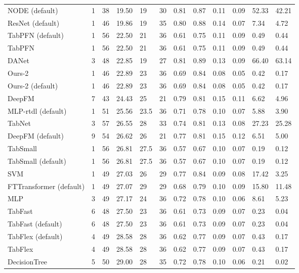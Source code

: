 \begin{tabular}{lllllrllllll}
NODE (default) & 1 & 38 & 19.50 & 19 & 30 & 0.81 & 0.87 & 0.11 & 0.09 & 52.33 & 42.21 \\
ResNet (default) & 1 & 46 & 19.86 & 19 & 35 & 0.80 & 0.88 & 0.14 & 0.07 & 7.34 & 4.72 \\
TabPFN (default) & 1 & 56 & 22.50 & 21 & 36 & 0.61 & 0.75 & 0.11 & 0.09 & 0.49 & 0.44 \\
TabPFN & 1 & 56 & 22.50 & 21 & 36 & 0.61 & 0.75 & 0.11 & 0.09 & 0.49 & 0.44 \\
DANet & 3 & 48 & 22.85 & 19 & 27 & 0.81 & 0.89 & 0.13 & 0.09 & 66.40 & 63.14 \\
Ours-2 & 1 & 46 & 22.89 & 23 & 36 & 0.69 & 0.84 & 0.08 & 0.05 & 0.42 & 0.17 \\
Ours-2 (default) & 1 & 46 & 22.89 & 23 & 36 & 0.69 & 0.84 & 0.08 & 0.05 & 0.42 & 0.17 \\
DeepFM & 7 & 43 & 24.43 & 25 & 21 & 0.79 & 0.81 & 0.15 & 0.11 & 6.62 & 4.96 \\
MLP-rtdl (default) & 1 & 51 & 25.56 & 23.5 & 36 & 0.71 & 0.78 & 0.10 & 0.07 & 5.88 & 3.90 \\
TabNet & 3 & 57 & 26.55 & 28 & 33 & 0.74 & 0.81 & 0.13 & 0.08 & 27.23 & 25.28 \\
DeepFM (default) & 9 & 54 & 26.62 & 26 & 21 & 0.77 & 0.81 & 0.15 & 0.12 & 6.51 & 5.00 \\
TabSmall & 1 & 56 & 26.81 & 27.5 & 36 & 0.57 & 0.67 & 0.10 & 0.07 & 0.19 & 0.12 \\
TabSmall (default) & 1 & 56 & 26.81 & 27.5 & 36 & 0.57 & 0.67 & 0.10 & 0.07 & 0.19 & 0.12 \\
SVM & 1 & 49 & 27.03 & 26 & 29 & 0.77 & 0.84 & 0.09 & 0.08 & 17.42 & 3.25 \\
FTTransformer (default) & 1 & 49 & 27.07 & 29 & 29 & 0.68 & 0.79 & 0.10 & 0.09 & 15.80 & 11.48 \\
MLP & 3 & 49 & 27.17 & 24 & 36 & 0.72 & 0.78 & 0.10 & 0.06 & 8.61 & 5.23 \\
TabFast & 6 & 48 & 27.50 & 23 & 36 & 0.61 & 0.73 & 0.09 & 0.07 & 0.23 & 0.04 \\
TabFast (default) & 6 & 48 & 27.50 & 23 & 36 & 0.61 & 0.73 & 0.09 & 0.07 & 0.23 & 0.04 \\
TabFlex (default) & 4 & 49 & 28.58 & 28 & 36 & 0.62 & 0.77 & 0.09 & 0.07 & 0.43 & 0.17 \\
TabFlex & 4 & 49 & 28.58 & 28 & 36 & 0.62 & 0.77 & 0.09 & 0.07 & 0.43 & 0.17 \\
DecisionTree & 5 & 50 & 29.00 & 28 & 35 & 0.72 & 0.78 & 0.10 & 0.06 & 0.21 & 0.02 \\

\end{tabular}
